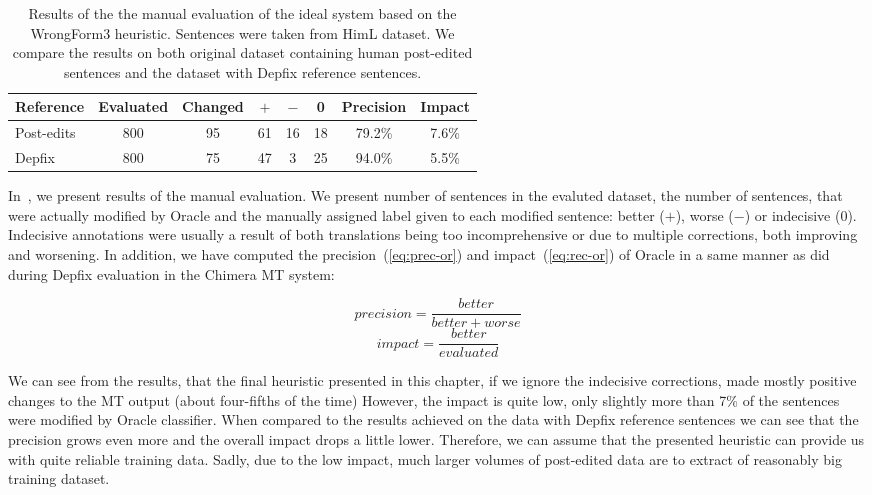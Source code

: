 \begin{table*}[t]
\centering
\small

\begin{tabular}{l|cc|ccc|cc}
Reference  &  Evaluated  &  Changed  &  $+$  &  $-$  &  0  &  Precision  &  Impact  \\
\hline
Post-edits  &  800  &  95  &  61  &  16  &  18  &  79.2\%  &  7.6\%  \\
Depfix  & 800  &  75  &  47  &  3  &  25  &  94.0\%  &  5.5\%  \\
\end{tabular}
\caption[Manual evaluation of the Czech Oracle classifier]{
Results of the the manual evaluation of the ideal system based on the WrongForm3 heuristic.
Sentences were taken from HimL dataset. We compare the results on both original dataset
containing human post-edited sentences and
the dataset with Depfix reference sentences.
}
\label{oracle-maneval}
\end{table*}

In~, we present results of the manual evaluation.
We present number of sentences in the evaluted dataset, the number of sentences,
that were actually modified by Oracle and the manually assigned label given to each modified sentence:
better ($+$), worse ($-$) or indecisive (0).
Indecisive annotations were usually a result of both translations being
too incomprehensive or due to multiple corrections, both improving and worsening.
In addition, we have computed the precision~(\ref{eq:prec-or}) and
impact~(\ref{eq:rec-or}) of Oracle in a same manner as \citet{bojar-rosa-tamchyna:2013:WMT} did during Depfix evaluation in the Chimera MT system:

\begin{equation} \label{eq:prec-or}
precision = \frac{better}{better + worse}
\end{equation}
\begin{equation} \label{eq:rec-or}
impact = \frac{better}{evaluated}
\end{equation}

We can see from the results, that the final heuristic presented in this chapter,
if we ignore the indecisive corrections,
made mostly positive changes to the MT output (about four-fifths of the time)
However, the impact is quite low, only slightly more than 7\% of the sentences were modified
by Oracle classifier. When compared to the results achieved on the data with Depfix
reference sentences we can see that the precision grows even more
and the overall impact drops a little lower.
Therefore, we can assume that the presented heuristic can provide us with
quite reliable training data. Sadly, due to the low impact, much larger
volumes of post-edited data are to extract of reasonably big training dataset.

